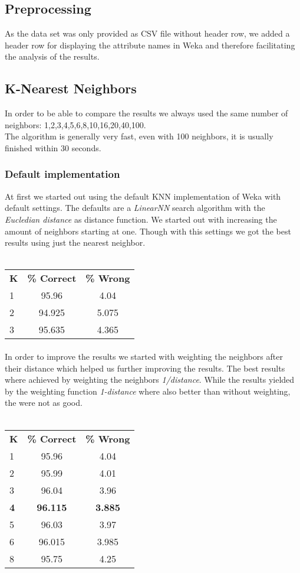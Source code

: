 \documentclass{sig-alternate-05-2015}
\begin{document}
\subsection{Preprocessing}
As the data set was only provided as CSV file without header row, we added a header row for displaying the attribute names in Weka and therefore facilitating the analysis of the results. 
\\
\subsection{K-Nearest Neighbors}
In order to be able to compare the results we always used the same number of neighbors: 1,2,3,4,5,6,8,10,16,20,40,100.\\
The algorithm is generally very fast, even with 100 neighbors, it is usually finished within 30 seconds. 
\subsubsection{Default implementation}
At first we started out using the default KNN implementation of Weka with default settings. The defaults are a \emph{LinearNN} search algorithm with the \emph{Eucledian distance} as distance function. We started out with increasing the amount of neighbors starting at one. Though with this settings we got the best results using just the nearest neighbor. 
\\\\
\begin{tabular}{ l | c |c }
\textbf{K} & \textbf{\% Correct} & \textbf{\% Wrong} \\
1 & 95.96 & 4.04 \\
2 & 94.925 & 5.075 \\
3 & 95.635 & 4.365 \\
\end{tabular}
\paragraph{}In order to improve the results we started with weighting the neighbors after their distance which helped us further improving the results. The best results where achieved by weighting the neighbors \emph{1/distance}. While the results yielded by the weighting function \emph{1-distance} where also better than without weighting, the were not as good.
\\\\
\begin{tabular}{ l | c | c }
\textbf{K} & \textbf{\% Correct} & \textbf{\% Wrong} \\
1 & 95.96 & 4.04 \\
2 & 95.99& 4.01\\
3 & 96.04 & 3.96 \\
\textbf{4} & \textbf{96.115} & \textbf{3.885} \\
5 & 96.03 & 3.97 \\
6 & 96.015 & 3.985 \\
8 & 95.75 & 4.25 \\
\end{tabular}
\end{document}
